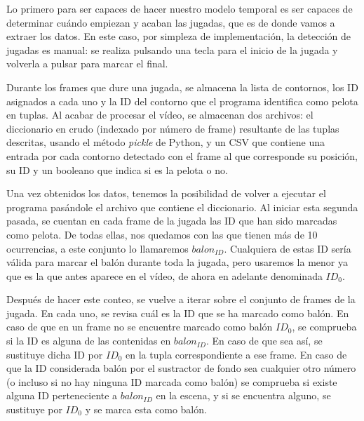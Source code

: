Lo primero para ser capaces de hacer nuestro modelo temporal es ser capaces de determinar cuándo empiezan y acaban las jugadas, que es de donde vamos a extraer los datos. En este caso, por simpleza de implementación, la detección de jugadas es manual: se realiza pulsando una tecla para el inicio de la jugada y volverla a pulsar para marcar el final. 

Durante los frames que dure una jugada, se almacena la lista de contornos, los ID asignados a cada uno y la ID del contorno que el programa identifica como pelota en tuplas. Al acabar de procesar el vídeo, se almacenan dos archivos: el diccionario en crudo (indexado por número de frame) resultante de las tuplas descritas, usando el método \textit{pickle} de Python, y un CSV que contiene una entrada por cada contorno detectado con el frame al que corresponde su posición, su ID y un booleano que indica si es la pelota o no.

Una vez obtenidos los datos, tenemos la posibilidad de volver a ejecutar el programa pasándole el archivo que contiene el diccionario. Al iniciar esta segunda pasada, se cuentan en cada frame de la jugada las ID que han sido marcadas como pelota. De todas ellas, nos quedamos con las que tienen más de 10 ocurrencias, a este conjunto lo llamaremos $balon_{ID}$. Cualquiera de estas ID sería válida para marcar el balón durante toda la jugada, pero usaremos la menor ya que es la que antes aparece en el vídeo, de ahora en adelante denominada $ID_0$.

Después de hacer este conteo, se vuelve a iterar sobre el conjunto de frames de la jugada. En cada uno, se revisa cuál es la ID que se ha marcado como balón. En caso de que en un frame no se encuentre marcado como balón $ID_0$, se comprueba si la ID es alguna de las contenidas en $balon_{ID}$. En caso de que sea así, se sustituye dicha ID por $ID_0$ en la tupla correspondiente a ese frame. En caso de que la ID considerada balón por el sustractor de fondo sea cualquier otro número (o incluso si no hay ninguna ID marcada como balón) se comprueba si existe alguna ID perteneciente a $balon_{ID}$ en la escena, y si se encuentra alguno, se sustituye por $ID_0$ y se marca esta como balón.

